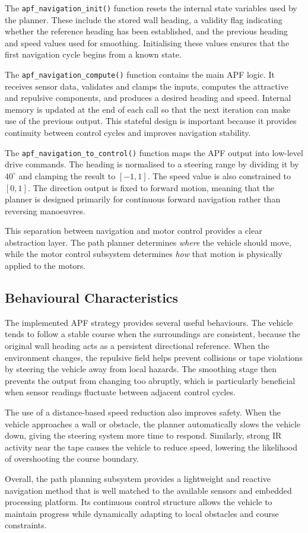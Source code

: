 The \texttt{apf\_navigation\_init()} function resets the internal state variables used by the planner. These include the stored wall heading, a validity flag indicating whether the reference heading has been established, and the previous heading and speed values used for smoothing. Initialising these values ensures that the first navigation cycle begins from a known state.

The \texttt{apf\_navigation\_compute()} function contains the main APF logic. It receives sensor data, validates and clamps the inputs, computes the attractive and repulsive components, and produces a desired heading and speed. Internal memory is updated at the end of each call so that the next iteration can make use of the previous output. This stateful design is important because it provides continuity between control cycles and improves navigation stability.

The \texttt{apf\_navigation\_to\_control()} function maps the APF output into low-level drive commands. The heading is normalised to a steering range by dividing it by $40^\circ$ and clamping the result to $[-1,1]$. The speed value is also constrained to $[0,1]$. The direction output is fixed to forward motion, meaning that the planner is designed primarily for continuous forward navigation rather than reversing manoeuvres.

This separation between navigation and motor control provides a clear abstraction layer. The path planner determines \emph{where} the vehicle should move, while the motor control subsystem determines \emph{how} that motion is physically applied to the motors.

\subsection{Behavioural Characteristics}

The implemented APF strategy provides several useful behaviours. The vehicle tends to follow a stable course when the surroundings are consistent, because the original wall heading acts as a persistent directional reference. When the environment changes, the repulsive field helps prevent collisions or tape violations by steering the vehicle away from local hazards. The smoothing stage then prevents the output from changing too abruptly, which is particularly beneficial when sensor readings fluctuate between adjacent control cycles.

The use of a distance-based speed reduction also improves safety. When the vehicle approaches a wall or obstacle, the planner automatically slows the vehicle down, giving the steering system more time to respond. Similarly, strong IR activity near the tape causes the vehicle to reduce speed, lowering the likelihood of overshooting the course boundary.

Overall, the path planning subsystem provides a lightweight and reactive navigation method that is well matched to the available sensors and embedded processing platform. Its continuous control structure allows the vehicle to maintain progress while dynamically adapting to local obstacles and course constraints.

